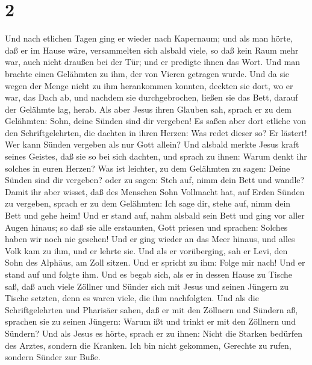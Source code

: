 \hypertarget{section-1}{%
\section{2}\label{section-1}}

 Und nach etlichen Tagen ging er wieder nach Kapernaum;
und als man hörte, daß er im Hause wäre,  versammelten
sich alsbald viele, so daß kein Raum mehr war, auch nicht draußen bei
der Tür; und er predigte ihnen das Wort.  Und man brachte
einen Gelähmten zu ihm, der von Vieren getragen wurde. 
Und da sie wegen der Menge nicht zu ihm herankommen konnten, deckten sie
dort, wo er war, das Dach ab, und nachdem sie durchgebrochen, ließen sie
das Bett, darauf der Gelähmte lag, herab.  Als aber Jesus
ihren Glauben sah, sprach er zu dem Gelähmten: Sohn, deine Sünden sind
dir vergeben!  Es saßen aber dort etliche von den
Schriftgelehrten, die dachten in ihren Herzen:  Was redet
dieser so? Er lästert! Wer kann Sünden vergeben als nur Gott allein?
 Und alsbald merkte Jesus kraft seines Geistes, daß sie so
bei sich dachten, und sprach zu ihnen: Warum denkt ihr solches in euren
Herzen?  Was ist leichter, zu dem Gelähmten zu sagen:
Deine Sünden sind dir vergeben? oder zu sagen: Steh auf, nimm dein Bett
und wandle?  Damit ihr aber wisset, daß des Menschen Sohn
Vollmacht hat, auf Erden Sünden zu vergeben, sprach er zu dem Gelähmten:
 Ich sage dir, stehe auf, nimm dein Bett und gehe heim!
 Und er stand auf, nahm alsbald sein Bett und ging vor
aller Augen hinaus; so daß sie alle erstaunten, Gott priesen und
sprachen: Solches haben wir noch nie gesehen!  Und er
ging wieder an das Meer hinaus, und alles Volk kam zu ihm, und er lehrte
sie.  Und als er vorüberging, sah er Levi, den Sohn des
Alphäus, am Zoll sitzen. Und er spricht zu ihm: Folge mir nach! Und er
stand auf und folgte ihm.  Und es begab sich, als er in
dessen Hause zu Tische saß, daß auch viele Zöllner und Sünder sich mit
Jesus und seinen Jüngern zu Tische setzten, denn es waren viele, die ihm
nachfolgten.  Und als die Schriftgelehrten und Pharisäer
sahen, daß er mit den Zöllnern und Sündern aß, sprachen sie zu seinen
Jüngern: Warum ißt und trinkt er mit den Zöllnern und Sündern?
 Und als Jesus es hörte, sprach er zu ihnen: Nicht die
Starken bedürfen des Arztes, sondern die Kranken. Ich bin nicht
gekommen, Gerechte zu rufen, sondern Sünder zur Buße. 
